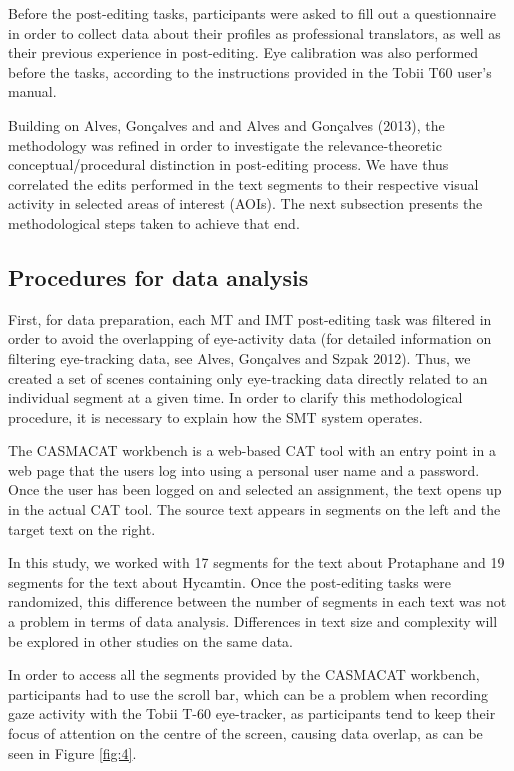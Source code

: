 \documentclass[output=paper]{langsci/langscibook}
\begin{document}
Before the post-editing tasks, participants were asked to fill out a questionnaire in order to collect data about their profiles as professional translators, as well as their previous experience in post-editing. Eye calibration was also performed before the tasks, according to the instructions provided in the Tobii T60 user’s manual.



Building on Alves, Gonçalves and \citet{Szpak2012} and Alves and Gonçalves (2013), the methodology was refined in order to investigate the relevance-theoretic conceptual/procedural distinction in post-editing process. We have thus correlated the edits performed in the text segments to their respective visual activity in selected areas of interest (AOIs). The next subsection presents the methodological steps taken to achieve that end.


\subsection{Procedures for data analysis}

First, for data preparation, each MT and IMT post-editing task was filtered in order to avoid the overlapping of eye-activity data (for detailed information on filtering eye-tracking data, see Alves, Gonçalves and Szpak 2012). Thus, we created a set of scenes containing only eye-tracking data directly related to an individual segment at a given time. In order to clarify this methodological procedure, it is necessary to explain how the SMT system operates.  


The CASMACAT workbench is a web-based CAT tool with an entry point in a web page that the users log into using a personal user name and a password. Once the user has been logged on and selected an assignment, the text opens up in the actual CAT tool. The source text appears in segments on the left and the target text on the right. 



In this study, we worked with 17 segments for the text about Protaphane and 19 segments for the text about Hycamtin. Once the post-editing tasks were randomized, this difference between the number of segments in each text was not a problem in terms of data analysis. Differences in text size and complexity will be explored in other studies on the same data. 



In order to access all the segments provided by the CASMACAT workbench,  participants had to use the scroll bar, which can be a problem when recording gaze activity with the Tobii T-60 eye-tracker, as participants tend to keep their focus of attention on the centre of the screen, causing data overlap, as can be seen in Figure \ref{fig:4}. 
\end{document}
